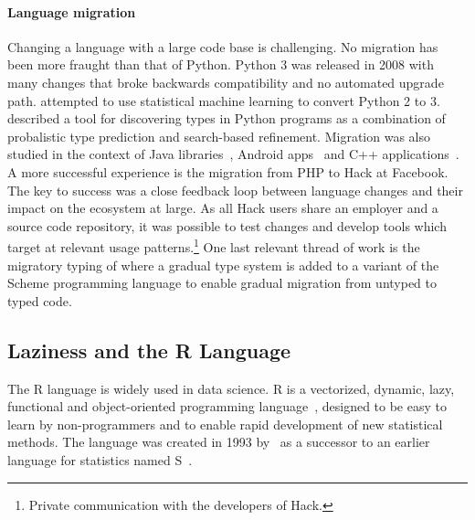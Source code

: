 \documentclass[review,nonacm,screen,acmsmall,anonymous=true]{acmart}
\begin{document}
\paragraph{Language migration} Changing a language with a large code base
is challenging. No migration has been more fraught than that of Python. Python 3
was released in 2008 with many changes that broke backwards compatibility and no
automated upgrade path. \citet{Agg15} attempted to use statistical machine
learning to convert Python 2 to 3. \citet{Pra20} described a tool for
discovering types in Python programs as a combination of probalistic type
prediction and search-based refinement. Migration was also studied in the
context of Java libraries~\cite{Xu19}, Android apps~\cite{Orso20} and C++
applications~\cite{OB20}. A more successful experience is the migration from PHP
to Hack at Facebook. The key to success was a close feedback loop between
language changes and their impact on the ecosystem at large. As all Hack users
share an employer and a source code repository, it was possible to test changes
and develop tools which target at relevant usage patterns.\footnote{Private
  communication with the developers of Hack.} One last relevant thread of work
is the migratory typing of \citet{matthias06} where a gradual type system is
added to a variant of the Scheme programming language to enable gradual
migration from untyped to typed code.


\subsection{Laziness and the R Language}

The R language is widely used in data science. R is a vectorized, dynamic, lazy,
functional and object-oriented programming language~\cite{ecoop12}, designed to
be easy to learn by non-programmers and to enable rapid development of new
statistical methods. The language was created in 1993 by~\citet{R96} as a
successor to an earlier language for statistics named S~\cite{S88}.
\end{document}
